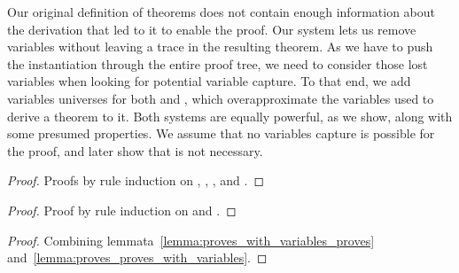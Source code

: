 Our original definition of theorems does not contain enough information about the derivation that led to it to enable the proof.
Our system lets us remove variables without leaving a trace in the resulting theorem.
As we have to push the instantiation through the entire proof tree, we need to consider those lost variables when looking for potential variable capture.
To that end, we add variables universes for both  and , which overapproximate the variables used to derive a theorem to it.
Both systems are equally powerful, as we show, along with some presumed properties.
We assume that no variables capture is possible for the proof, and later show that is not necessary.


\begin{lemma}
\end{lemma}
\begin{lemma}
\end{lemma}
\begin{lemma}
\end{lemma}
\begin{lemma}
\end{lemma}
\begin{lemma}
\end{lemma}
\begin{lemma}
\end{lemma}
\begin{proof}
    Proofs by rule induction on \isa{\(\Gamma\)}, \isa{\(\Psi\)}, \isa{\(\Omega\)}, and .
\end{proof}

\begin{lemma}
\end{lemma}
\begin{proof}
    Proof by rule induction on \isa{\(\Gamma\)} and .
\end{proof}

\begin{corollary}
\end{corollary}
\begin{proof}
    Combining lemmata~\ref{lemma:proves_with_variables_proves} and~\ref{lemma:proves_proves_with_variables}.
\end{proof}

